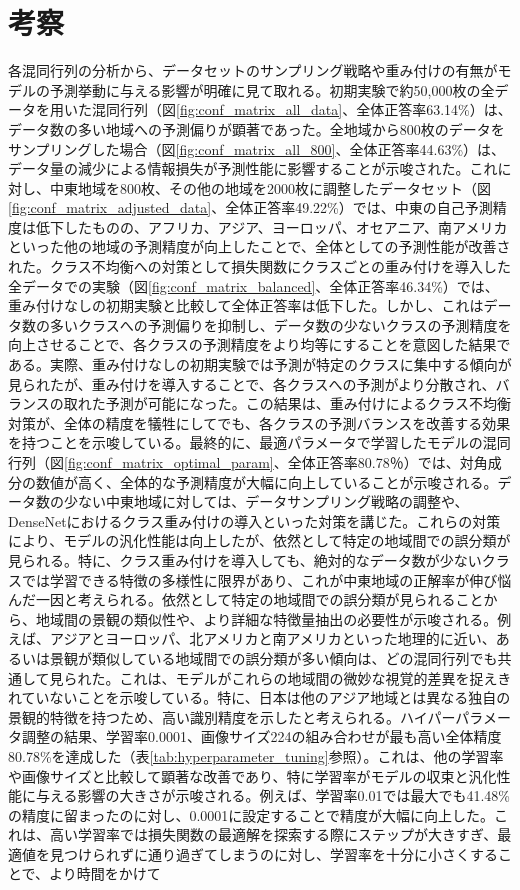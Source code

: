 \documentclass[a4paper, 11pt, titlepage]{jsarticle}
\begin{document}
\section{考察}各混同行列の分析から、データセットのサンプリング戦略や重み付けの有無がモデルの予測挙動に与える影響が明確に見て取れる。初期実験で約50,000枚の全データを用いた混同行列（図\ref{fig:conf_matrix_all_data}、全体正答率63.14\%）は、データ数の多い地域への予測偏りが顕著であった。全地域から800枚のデータをサンプリングした場合（図\ref{fig:conf_matrix_all_800}、全体正答率44.63\%）は、データ量の減少による情報損失が予測性能に影響することが示唆された。これに対し、中東地域を800枚、その他の地域を2000枚に調整したデータセット（図\ref{fig:conf_matrix_adjusted_data}、全体正答率49.22\%）では、中東の自己予測精度は低下したものの、アフリカ、アジア、ヨーロッパ、オセアニア、南アメリカといった他の地域の予測精度が向上したことで、全体としての予測性能が改善された。クラス不均衡への対策として損失関数にクラスごとの重み付けを導入した全データでの実験（図\ref{fig:conf_matrix_balanced}、全体正答率46.34\%）では、重み付けなしの初期実験と比較して全体正答率は低下した。しかし、これはデータ数の多いクラスへの予測偏りを抑制し、データ数の少ないクラスの予測精度を向上させることで、各クラスの予測精度をより均等にすることを意図した結果である。実際、重み付けなしの初期実験では予測が特定のクラスに集中する傾向が見られたが、重み付けを導入することで、各クラスへの予測がより分散され、バランスの取れた予測が可能になった。この結果は、重み付けによるクラス不均衡対策が、全体の精度を犠牲にしてでも、各クラスの予測バランスを改善する効果を持つことを示唆している。最終的に、最適パラメータで学習したモデルの混同行列（図\ref{fig:conf_matrix_optimal_param}、全体正答率80.78％）では、対角成分の数値が高く、全体的な予測精度が大幅に向上していることが示唆される。データ数の少ない中東地域に対しては、データサンプリング戦略の調整や、DenseNetにおけるクラス重み付けの導入といった対策を講じた。これらの対策により、モデルの汎化性能は向上したが、依然として特定の地域間での誤分類が見られる。特に、クラス重み付けを導入しても、絶対的なデータ数が少ないクラスでは学習できる特徴の多様性に限界があり、これが中東地域の正解率が伸び悩んだ一因と考えられる。依然として特定の地域間での誤分類が見られることから、地域間の景観の類似性や、より詳細な特徴量抽出の必要性が示唆される。例えば、アジアとヨーロッパ、北アメリカと南アメリカといった地理的に近い、あるいは景観が類似している地域間での誤分類が多い傾向は、どの混同行列でも共通して見られた。これは、モデルがこれらの地域間の微妙な視覚的差異を捉えきれていないことを示唆している。特に、日本は他のアジア地域とは異なる独自の景観的特徴を持つため、高い識別精度を示したと考えられる。ハイパーパラメータ調整の結果、学習率0.0001、画像サイズ224の組み合わせが最も高い全体精度80.78\%を達成した（表\ref{tab:hyperparameter_tuning}参照）。これは、他の学習率や画像サイズと比較して顕著な改善であり、特に学習率がモデルの収束と汎化性能に与える影響の大きさが示唆される。例えば、学習率0.01では最大でも41.48\%の精度に留まったのに対し、0.0001に設定することで精度が大幅に向上した。これは、高い学習率では損失関数の最適解を探索する際にステップが大きすぎ、最適値を見つけられずに通り過ぎてしまうのに対し、学習率を十分に小さくすることで、より時間をかけて
\end{document}
